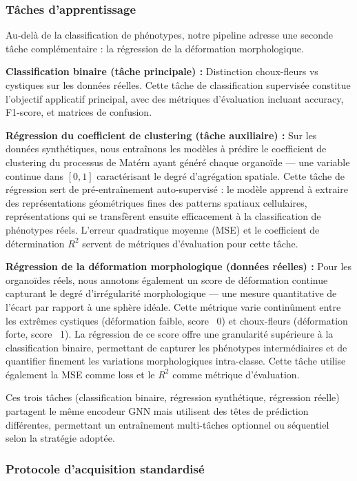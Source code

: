 \subsubsection{Tâches d'apprentissage}

Au-delà de la classification de phénotypes, notre pipeline adresse une seconde tâche complémentaire : la régression de la déformation morphologique.

\textbf{Classification binaire (tâche principale) :}
Distinction choux-fleurs vs cystiques sur les données réelles. Cette tâche de classification supervisée constitue l'objectif applicatif principal, avec des métriques d'évaluation incluant accuracy, F1-score, et matrices de confusion.

\textbf{Régression du coefficient de clustering (tâche auxiliaire) :}
Sur les données synthétiques, nous entraînons les modèles à prédire le coefficient de clustering du processus de Matérn ayant généré chaque organoïde — une variable continue dans $[0, 1]$ caractérisant le degré d'agrégation spatiale. Cette tâche de régression sert de pré-entraînement auto-supervisé : le modèle apprend à extraire des représentations géométriques fines des patterns spatiaux cellulaires, représentations qui se transfèrent ensuite efficacement à la classification de phénotypes réels. L'erreur quadratique moyenne (MSE) et le coefficient de détermination $R^2$ servent de métriques d'évaluation pour cette tâche.

\textbf{Régression de la déformation morphologique (données réelles) :}
Pour les organoïdes réels, nous annotons également un score de déformation continue capturant le degré d'irrégularité morphologique — une mesure quantitative de l'écart par rapport à une sphère idéale. Cette métrique varie continûment entre les extrêmes cystiques (déformation faible, score ~0) et choux-fleurs (déformation forte, score ~1). La régression de ce score offre une granularité supérieure à la classification binaire, permettant de capturer les phénotypes intermédiaires et de quantifier finement les variations morphologiques intra-classe. Cette tâche utilise également la MSE comme loss et le $R^2$ comme métrique d'évaluation.

Ces trois tâches (classification binaire, régression synthétique, régression réelle) partagent le même encodeur GNN mais utilisent des têtes de prédiction différentes, permettant un entraînement multi-tâches optionnel ou séquentiel selon la stratégie adoptée.

\subsubsection{Protocole d'acquisition standardisé}

